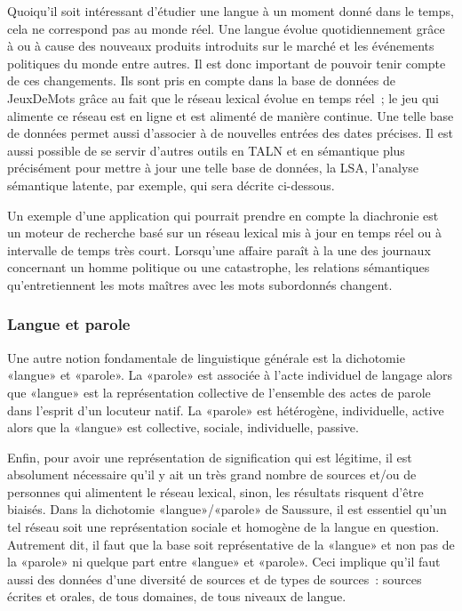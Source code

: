 \documentclass[a4paper,11pt,french]{article}
\begin{document}
Quoiqu'il soit intéressant d'étudier une langue à un moment donné dans le temps, cela ne correspond pas au monde réel. Une langue évolue quotidiennement grâce à ou à cause des nouveaux produits introduits sur le marché et les événements politiques du monde entre autres. Il est donc important de pouvoir tenir compte de ces changements. Ils sont pris en compte dans la base de données de JeuxDeMots grâce au fait que le réseau lexical évolue en temps réel~; le jeu qui alimente ce réseau est en ligne et est alimenté de manière continue. Une telle base de données permet aussi d'associer à de nouvelles entrées des dates précises. Il est aussi possible de se servir d'autres outils en TALN et en sémantique plus précisément pour mettre à jour une telle base de données, la LSA, l'analyse sémantique latente, par exemple, qui sera décrite ci-dessous.

Un exemple d'une application qui pourrait prendre en compte la diachronie est un moteur de recherche basé sur un réseau lexical mis à jour en temps réel ou à intervalle de temps très court. Lorsqu'une affaire paraît à la une des journaux concernant un homme politique ou une catastrophe, les relations sémantiques qu'entretiennent les mots maîtres avec les mots subordonnés changent.

\subsubsection{Langue et parole}

Une autre notion fondamentale de linguistique générale est la dichotomie «langue» et «parole». La «parole» est associée à l'acte individuel de langage alors que «langue» est la représentation collective de l'ensemble des actes de parole dans l'esprit d'un locuteur natif. La «parole» est hétérogène, individuelle, active alors que la «langue» est collective, sociale, individuelle, passive. 

Enfin, pour avoir une représentation de signification qui est légitime, il est absolument nécessaire qu'il y ait un très grand nombre de sources et/ou de personnes qui alimentent le réseau lexical, sinon, les résultats risquent d'être biaisés. Dans la dichotomie «langue»/«parole» de Saussure, il est essentiel qu'un tel réseau soit une représentation sociale et homogène de la langue en question. Autrement dit, il faut que la base soit représentative de la «langue» et non pas de la «parole» ni quelque part entre «langue» et «parole». Ceci implique qu'il faut aussi des données d'une diversité de sources et de types de sources~: sources écrites et orales, de tous domaines, de tous niveaux de langue. 
\end{document}
